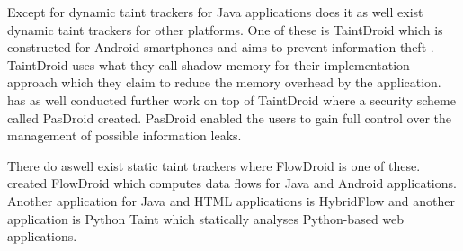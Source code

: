 Except for dynamic taint trackers for Java applications does it as well exist dynamic taint trackers for other platforms. One of these is TaintDroid which is constructed for Android smartphones and aims to prevent information theft \parencite{EnckWilliam2014Taif}. TaintDroid uses what they call shadow memory for their implementation approach which they claim to reduce the memory overhead by the application. \textcite{HsiaoS.W.2014PRse} has as well conducted further work on top of TaintDroid where a security scheme called PasDroid created. PasDroid enabled the users to gain full control over the management of possible information leaks.

There do aswell exist static taint trackers where FlowDroid is one of these. \textcite{ArztS.2014FPcf} created FlowDroid which computes data flows for Java and Android applications. Another application for Java and HTML applications is HybridFlow \parencite{HybridFlow} and another application is Python Taint \parencite{PythonTaint} which statically analyses Python-based web applications.
